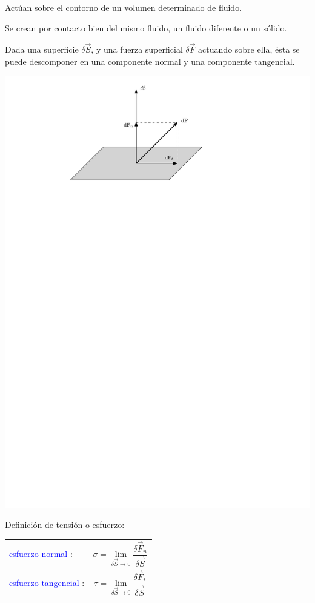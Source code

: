 Act\'uan sobre el contorno de un  volumen determinado de fluido.

Se crean por contacto bien del mismo fluido, un fluido diferente o un s\'olido.

Dada una superficie $\delta \vec S$, y una fuerza superficial $\delta \vec F$ actuando sobre ella, \'esta se
puede descomponer en una componente normal y una componente tangencial.

\begin{center}
	\includegraphics{TeX_files/chapter01-Introduccion/dS.pdf}
\end{center}

Definici\'on de tensi\'on o esfuerzo:

	\begin{tabular}{ll}
		\textcolor{blue}{esfuerzo normal} : & \begin{minipage}{10cm}$$\sigma = \lim_{\delta \vec S \rightarrow 0} \frac{\delta \vec F_n}{\delta \vec S}$$\end{minipage} \\
		\textcolor{blue}{esfuerzo tangencial} : & \begin{minipage}{10cm}$$\tau = \lim_{\delta \vec S \rightarrow 0} \frac{\delta \vec F_t}{\delta \vec S}$$ \end{minipage}\\
	\end{tabular}

